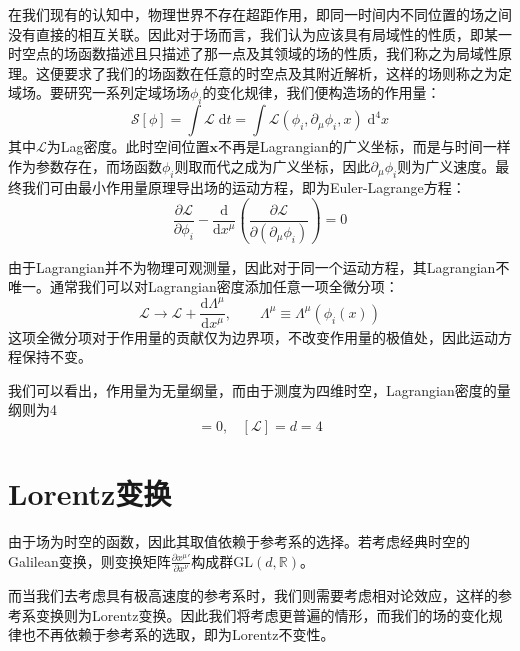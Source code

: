 在我们现有的认知中，物理世界不存在超距作用，即同一时间内不同位置的场之间没有直接的相互关联。因此对于场而言，我们认为应该具有局域性的性质，即某一时空点的场函数描述且只描述了那一点及其领域的场的性质，我们称之为\gls{局域性}原理。这便要求了我们的场函数在任意的时空点及其附近解析，这样的场则称之为定域场。要研究一系列定域场场$\phi_i$的变化规律，我们便构造场的作用量：
\begin{equation}
	\mathcal{S}[\phi]=\int\mathcal{L}\;\mathrm{d}t=\int  \mathscr{L}(\phi_{i},\partial_\mu\phi_i,x)\;\mathrm{d}^4x
\end{equation}
其中$\mathscr{L}$为\gls{Lag}密度。此时空间位置$\boldsymbol{x}$不再是Lagrangian的广义坐标，而是与时间一样作为参数存在，而场函数$\phi_i$则取而代之成为广义坐标，因此$\partial_\mu\phi_i$则为广义速度。最终我们可由最小作用量原理导出场的运动方程，即为Euler-Lagrange方程：
\begin{equation}
	\frac{\partial \mathscr{L}}{\partial \phi_i}-\frac{\mathrm{d}}{\mathrm{d}x^\mu}\left( \frac{\partial\mathscr{L}}{\partial(\partial_\mu \phi_i)}\right)=0
\end{equation}

由于Lagrangian并不为物理可观测量，因此对于同一个运动方程，其Lagrangian不唯一。通常我们可以对Lagrangian密度添加任意一项全微分项：
\begin{equation}
	\mathscr{L}\rightarrow\mathscr{L}+\frac{\mathrm{d}\Lambda^\mu}{\mathrm{d}x^\mu},\qquad\Lambda^\mu\equiv\Lambda^\mu(\phi_i (x))
\end{equation}
这项全微分项对于作用量的贡献仅为边界项，不改变作用量的极值处，因此运动方程保持不变。

我们可以看出，作用量为无量纲量，而由于测度为四维时空，Lagrangian密度的量纲则为4
\begin{equation}
    [\mathcal{S}] = 0,~~~~[\mathscr{L}] =d= 4
\end{equation}
\section{Lorentz变换}
由于场为时空的函数，因此其取值依赖于参考系的选择。若考虑经典时空的Galilean变换，则变换矩阵$\frac{\partial {x^\mu}'}{\partial x^\nu}$构成群$\mathrm{GL}(d,\mathbb{R})$。

而当我们去考虑具有极高速度的参考系时，我们则需要考虑相对论效应，这样的参考系变换则为Lorentz变换。因此我们将考虑更普遍的情形，而我们的场的变化规律也不再依赖于参考系的选取，即为Lorentz不变性。

